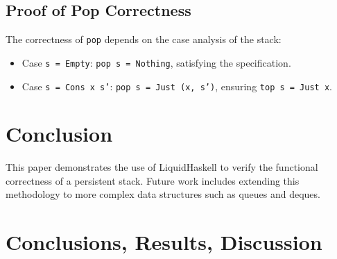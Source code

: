 \documentclass[]{rptuseminar}
\begin{document}
\subsection{Proof of Pop Correctness}
The correctness of \texttt{pop} depends on the case analysis of the stack:

\begin{itemize}
  \item Case \texttt{s = Empty}: \texttt{pop s = Nothing}, satisfying the specification.
  \item Case \texttt{s = Cons x s'}: \texttt{pop s = Just (x, s')}, ensuring \texttt{top s = Just x}.
\end{itemize}

\section{Conclusion}
This paper demonstrates the use of LiquidHaskell to verify the functional correctness of a persistent stack. Future work includes extending this methodology to more complex data structures such as queues and deques.
\label{sec:example}

\section{Conclusions, Results, Discussion}
\label{sec:conclusions}

\newpage
\nocite{*}



\end{document}

